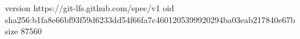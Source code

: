 version https://git-lfs.github.com/spec/v1
oid sha256:b1fa8e66bf93f59d6233dd54f66fa7c4601205399920294ba03eab217840e67b
size 87560
